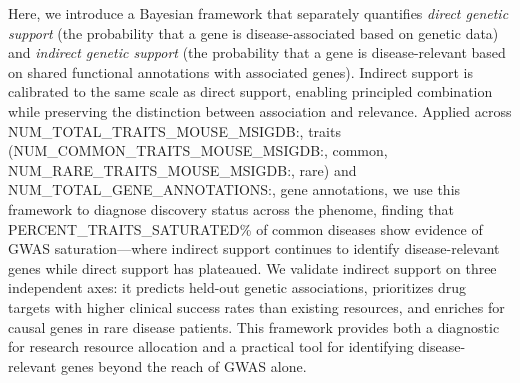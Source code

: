 Here, we introduce a Bayesian framework that separately quantifies \textit{direct genetic support} (the probability that a gene is disease-associated based on genetic data) and \textit{indirect genetic support} (the probability that a gene is disease-relevant based on shared functional annotations with associated genes). Indirect support is calibrated to the same scale as direct support, enabling principled combination while preserving the distinction between association and relevance. Applied across {{NUM_TOTAL_TRAITS_MOUSE_MSIGDB:,}} traits ({{NUM_COMMON_TRAITS_MOUSE_MSIGDB:,}} common, {{NUM_RARE_TRAITS_MOUSE_MSIGDB:,}} rare) and {{NUM_TOTAL_GENE_ANNOTATIONS:,}} gene annotations, we use this framework to diagnose discovery status across the phenome, finding that {{PERCENT_TRAITS_SATURATED}}\% of common diseases show evidence of GWAS saturation---where indirect support continues to identify disease-relevant genes while direct support has plateaued. We validate indirect support on three independent axes: it predicts held-out genetic associations, prioritizes drug targets with higher clinical success rates than existing resources, and enriches for causal genes in rare disease patients. This framework provides both a diagnostic for research resource allocation and a practical tool for identifying disease-relevant genes beyond the reach of GWAS alone.


